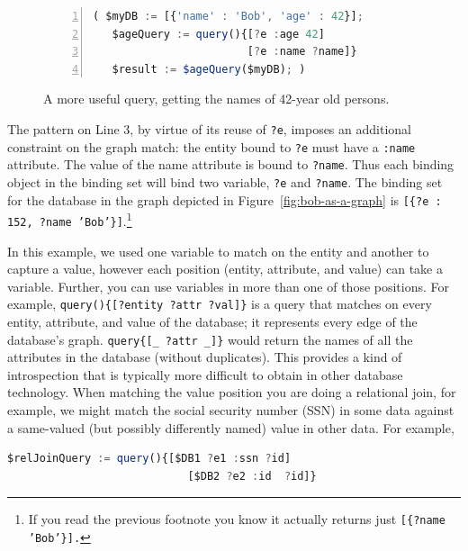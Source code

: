 \documentclass[10pt,letterpaper]{article} %
\newcommand{\stt}[1]{\texttt{#1}} %
\begin{document}
\begin{figure}[H]
    \caption{A more useful query, getting the names of 42-year old persons.}
    \label{code:bob-age-more}
\begin{lstlisting}[language=JavaScript,numberstyle=\scriptsize,basicstyle=\ttfamily\scriptsize,numbers=left,stepnumber=1,breaklines=true]
 ( $myDB := [{'name' : 'Bob', 'age' : 42}];
   $ageQuery := query(){[?e :age 42]
                        [?e :name ?name]}
   $result := $ageQuery($myDB); )
\end{lstlisting}
\end{figure} \vspace{-3em}

The pattern on Line 3, by virtue of its reuse of \stt{?e}, imposes an additional constraint on the graph match: the entity bound to \stt{?e} must have a \stt{:name} attribute.
The value of the name attribute is bound to \stt{?name}.
Thus each binding object in the binding set will bind two variable, \stt{?e} and \stt{?name}.
The binding set for the database in the graph depicted in Figure~\ref{fig:bob-as-a-graph} is \stt{[\{?e : 152, ?name 'Bob'\}]}.\footnote{If you read the previous footnote you know it actually returns just \stt{[\{?name 'Bob'\}].}}

In this example, we used one variable to match on the entity and another to capture a value, however each position (entity, attribute, and value) can take a variable.
Further, you can use variables in more than one of those positions.
For example, \stt{query()\{[?entity ?attr ?val]\}} is a query that matches on every entity, attribute, and value of the database; it represents every edge of the database's graph.
\stt{query\{[\_ ?attr \_]\}} would return the names of all the attributes in the database (without duplicates). %
This provides a kind of introspection that is typically more difficult to obtain in other database technology.
When matching the value position you are doing a relational join, for example, we might match the social security number (SSN) in
some data against a same-valued (but possibly differently named) value in other data.
For example,

\begin{lstlisting}[language=JavaScript,numbers=none,basicstyle=\ttfamily\scriptsize]
   $relJoinQuery := query(){[$DB1 ?e1 :ssn ?id]
                            [$DB2 ?e2 :id  ?id]}
\end{lstlisting} \vspace{-2em}
\end{document}
